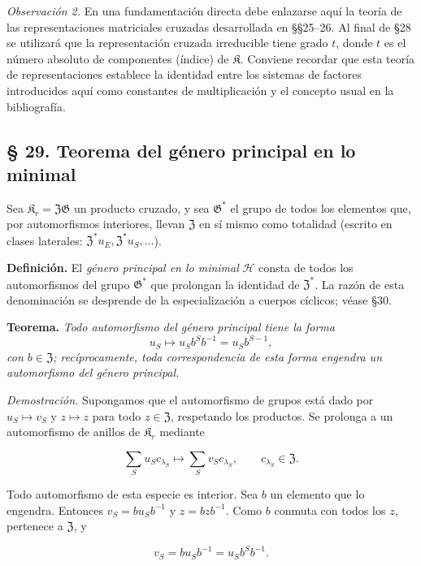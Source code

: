 \noindent\emph{Observación 2.} En una fundamentación directa debe enlazarse aquí la teoría de las representaciones matriciales cruzadas desarrollada en §§25--26. Al final de §28 se utilizará que la representación cruzada irreducible tiene grado $t$, donde $t$ es el número absoluto de componentes (índice) de $\mathfrak K$. Conviene recordar que esta teoría de representaciones establece la identidad entre los sistemas de factores introducidos aquí como constantes de multiplicación y el concepto usual en la bibliografía.



\subsection*{§ 29. Teorema del género principal en lo minimal}\label{hauptgeschlechtssatz-im-minimalen}

Sea $\mathfrak K_r=\mathfrak Z\mathfrak G$ un producto cruzado, y sea $\mathfrak G^*$ el grupo de todos los elementos que, por automorfismos interiores, llevan $\mathfrak Z$ en sí mismo como totalidad (escrito en clases laterales: $\mathfrak Z^*u_E,\mathfrak Z^*u_S,\ldots$).

\noindent\textbf{Definición.} El \emph{género principal en lo minimal} $\mathscr H$ consta de todos los automorfismos del grupo $\mathfrak G^*$ que prolongan la identidad de $\mathfrak Z^*$. La razón de esta denominación se desprende de la especialización a cuerpos cíclicos; véase §30.

\noindent\textbf{Teorema.} \emph{Todo automorfismo del género principal tiene la forma
\[
u_S\longmapsto u_Sb^Sb^{-1}=u_Sb^{S-1},
\]
con $b\in\mathfrak Z$; recíprocamente, toda correspondencia de esta forma engendra un automorfismo del género principal.}

\noindent\emph{Demostración.} Supongamos que el automorfismo de grupos está dado por $u_S\mapsto v_S$ y $z\mapsto z$ para todo $z\in\mathfrak Z$, respetando los productos. Se prolonga a un automorfismo de anillos de $\mathfrak K_r$ mediante

\[
\sum_Su_Sc_{\lambda_S}\longmapsto\sum_Sv_Sc_{\lambda_S},
\qquad c_{\lambda_S}\in\mathfrak Z.
\]

Todo automorfismo de esta especie es interior. Sea $b$ un elemento que lo engendra. Entonces $v_S=bu_Sb^{-1}$ y $z=bzb^{-1}$. Como $b$ conmuta con todos los $z$, pertenece a $\mathfrak Z$, y

\[
v_S=bu_Sb^{-1}=u_Sb^Sb^{-1}.
\]

